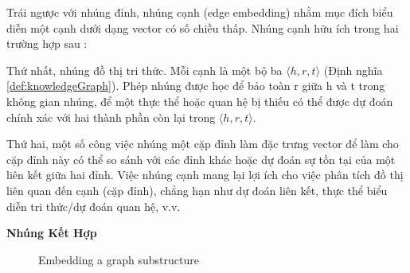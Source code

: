 Trái ngược với nhúng đỉnh, nhúng cạnh (edge embedding) nhằm mục đích biểu diễn một cạnh dưới dạng vector có số chiều thấp. Nhúng cạnh hữu ích trong hai trường hợp sau :

Thứ nhất, nhúng đồ thị tri thức. Mỗi cạnh là một bộ ba $\langle h, r, t \rangle$ (Định nghĩa \ref{def:knowledgeGraph}). Phép nhúng được học để bảo toàn r giữa h và t trong không gian nhúng, để một thực thể hoặc quan hệ bị thiếu có thể được dự đoán chính xác với hai thành phần còn lại trong $\langle h, r, t \rangle$.

Thứ hai, một số công việc nhúng một cặp đỉnh làm đặc trưng vector để làm cho cặp đỉnh này có thể so sánh với các đỉnh khác hoặc dự đoán sự tồn tại của một liên kết giữa hai đỉnh. Việc nhúng cạnh mang lại lợi ích cho việc phân tích đồ thị liên quan đến cạnh (cặp đỉnh), chẳng hạn như dự đoán liên kết, thực thể biểu diễn tri thức/dự đoán quan hệ, v.v.

\textbf{Nhúng Kết Hợp}

\begin{figure}[H]
	\centering
	
	\caption{Embedding a graph substructure}
	\label{fig:substructureEmbedding}
\end{figure}

